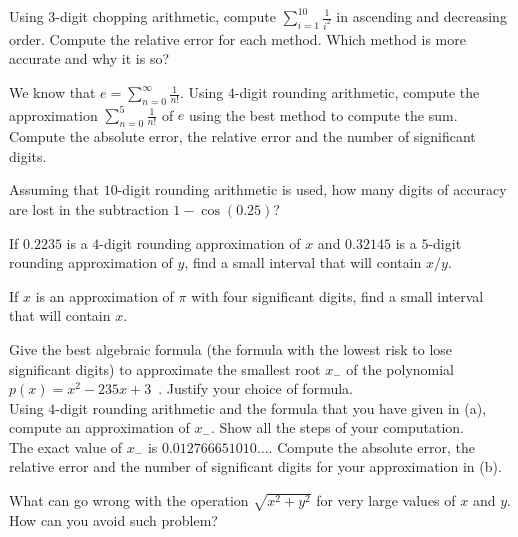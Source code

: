 \begin{question}
Using $3$-digit chopping arithmetic, compute
$\displaystyle \sum_{i=1}^{10} \frac{1}{i^2}$ in ascending and
decreasing order.  Compute the relative error for each method.  Which
method is more accurate and why it is so?
\label{arithQ2}
\end{question}

\begin{question}
We know that $\displaystyle e = \sum_{n=0}^\infty \frac{1}{n!}$.
Using $4$-digit rounding arithmetic, compute the approximation
$\displaystyle \sum_{n=0}^5 \frac{1}{n!}$ of $e$ using the best method
to compute the sum.  Compute the absolute error, the relative error
and the number of significant digits.
\label{arithQ3}
\end{question}

\begin{question}
Assuming that $10$-digit rounding arithmetic is used, how many digits
of accuracy are lost in the subtraction $1 - \cos(0.25)$?
\label{arithQ4}
\end{question}

\begin{question}
If $0.2235$ is a $4$-digit rounding approximation of $x$ and $0.32145$
is a $5$-digit rounding approximation of $y$, find a small interval that
will contain $x/y$.
\label{arithQ5}
\end{question}

\begin{question}
If $x$ is an approximation of $\pi$ with four significant digits,
find a small interval that will contain $x$.
\label{arithQ6}
\end{question}

\begin{question}
 Give the best algebraic formula (the formula with the lowest
risk to lose significant digits) to approximate the smallest root
$x_-$ of the polynomial $p(x) = x^2 - 235 x + 3$\ .  Justify your
choice of formula.\\
 Using $4$-digit rounding arithmetic and the formula that you
have given in (a), compute an approximation of $x_-$.  Show all the
steps of your computation.\\
 The exact value of $x_-$ is $0.012766651010\ldots$.  Compute
the absolute error, the relative error and the number of significant
digits for your approximation in (b).
\label{arithQ7}
\end{question}

\begin{question}
What can go wrong with the operation $\sqrt{x^2+y^2}$ for very large
values of $x$ and $y$.  How can you avoid such problem?
\label{arithQ8}
\end{question}

